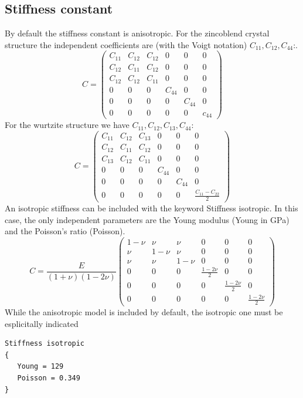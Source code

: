 \documentclass[11pt]{article} %
\begin{document}
\subsection{Stiffness constant}
By default the stiffness constant is anisotropic. For the zincoblend crystal structure the independent coefficients are (with the Voigt notation) $C_{11}, C_{12}, C_{44}$:.
\begin{equation}
C = \left(
 \begin{array}{cccccc}
C_{11} & C_{12} & C_{12} & 0 & 0 & 0\\
C_{12} & C_{11} & C_{12} & 0 & 0 & 0\\
C_{12} & C_{12} & C_{11} & 0 & 0 & 0\\
0 & 0 & 0 & C_{44} & 0 & 0\\
0 & 0 & 0& 0 & C_{44} & 0\\
 0 &  0  &  0 & 0 & 0 & c_{44} 
 \end{array}
 \right)
\end{equation}
For the wurtzite structure we have $C_{11}, C_{12}, C_{13}, C_{44}$:
\begin{equation}
C = \left(
 \begin{array}{cccccc}
C_{11} & C_{12} & C_{13} & 0 & 0 & 0\\
C_{12} & C_{11} & C_{12} & 0 & 0 & 0\\
C_{13} & C_{12} & C_{11} & 0 & 0 & 0\\
0 & 0 & 0 & C_{44} & 0 & 0\\
0 & 0 & 0& 0 & C_{44} & 0\\
 0 &  0  &  0 & 0 & 0 & \frac{C_{11} - C_{22}}{2}   
 \end{array}
 \right)
\end{equation}
An isotropic stiffness can be included with the keyword Stiffness isotropic. In this case, the only independent parameters are the Young modulus (Young in GPa) and the Poisson’s ratio (Poisson).
\begin{equation}
C =
\frac{E}{(1+\nu)(1-2\nu)} \left(
 \begin{array}{cccccc}
1-\nu & \nu & \nu & 0 & 0 & 0\\
\nu & 1-\nu & \nu & 0 & 0 & 0\\
\nu & \nu & 1-\nu & 0 & 0 & 0\\
0 & 0 & 0 & \frac{1-2\nu}{2} & 0 & 0\\
0 & 0 & 0& 0 & \frac{1-2\nu}{2} & 0\\
 0 &  0  &  0 & 0 & 0 & \frac{1-2\nu}{2}   
 \end{array}
 \right)
\end{equation}
While the anisotropic model is included by default, the isotropic one must be esplicitally indicated  
\begin{verbatim}
Stiffness isotropic
{
   Young = 129
   Poisson = 0.349
}
\end{verbatim}
\end{document}
